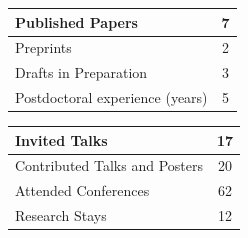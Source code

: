 \documentclass[a4paper]{article}
\begin{document}
		\begin{minipage}[t]{0.45\columnwidth}
		\center
	\begin{tabularx}{\linewidth}{|X|c|}
	\hline
	
	Published Papers & 7 \\
	\hline
	
	Preprints & 2 \\
	\hline
	
	Drafts in Preparation & 3 \\
	\hline
	
	Postdoctoral experience (years) & 5 \\
	\hline
	
	\end{tabularx}
		\end{minipage} 
		\hfill	
		\begin{minipage}[t]{0.45\columnwidth}
		\center
	\begin{tabularx}{\linewidth}{|X|c|}
	\hline
	
	Invited Talks & 17 \\
	\hline
	
	Contributed Talks and Posters & 20 \\
	\hline
	
	Attended Conferences & 62 \\
	\hline
	

	
	Research Stays & 12 \\
	\hline
	
	\end{tabularx}
		\end{minipage} 	
	\vspace{1em}	
	
	
	
\end{document}
